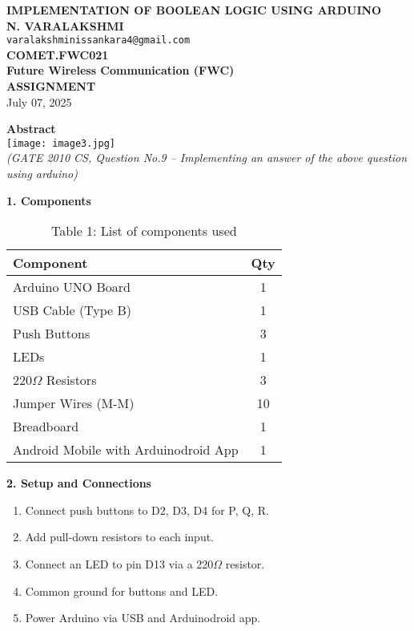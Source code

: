 \documentclass[12pt]{article}
\begin{document}
\begin{center}
    \textbf{\Large IMPLEMENTATION OF BOOLEAN LOGIC USING ARDUINO} \\[10pt]
    \textbf{N. VARALAKSHMI} \\
    \texttt{varalakshminissankara4@gmail.com} \\
    \textbf{COMET.FWC021} \\
    \textbf{Future Wireless Communication (FWC)} \\
    \textbf{ASSIGNMENT} \\[5pt]
    July 07, 2025
\end{center}
\vspace{1em}

\begin{multicols}{2}

\noindent\textbf{Abstract} \\[0.5em]
\texttt{[image: image3.jpg]} \\[0.5em]
\textit{(GATE 2010 CS, Question No.9  – Implementing an answer of the above question using arduino)}

\vspace{1em}
\noindent\textbf{1. Components}
\begin{table}[H]
\small
\centering
\begin{tabular}{|p{4.2cm}|c|}
\hline
\textbf{Component} & \textbf{Qty} \\
\hline
Arduino UNO Board & 1 \\


USB Cable (Type B) & 1 \\
Push Buttons & 3 \\
LEDs & 1 \\
220$\Omega$ Resistors & 3 \\
Jumper Wires (M-M) & 10 \\
Breadboard & 1 \\
Android Mobile with Arduinodroid App & 1 \\
\hline
\end{tabular}
\caption*{Table 1: List of components used}
\end{table}

\vspace{1em}
\noindent\textbf{2. Setup and Connections}
\begin{enumerate}
    \item Connect push buttons to D2, D3, D4 for P, Q, R.
    \item Add pull-down resistors to each input.
    \item Connect an LED to pin D13 via a 220$\Omega$ resistor.
    \item Common ground for buttons and LED.
    \item Power Arduino via USB and Arduinodroid app.
\end{enumerate}


\end{multicols}
\end{document}
